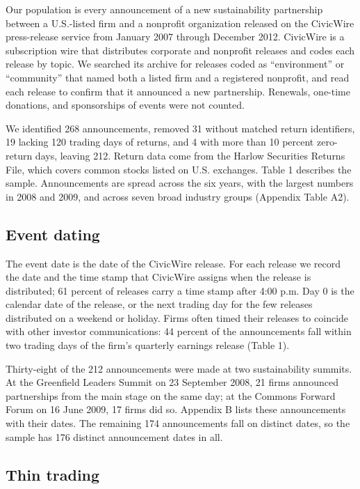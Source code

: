 \documentclass[11pt]{article}
\begin{document}
Our population is every announcement of a new sustainability partnership between a U.S.-listed firm and a nonprofit organization released on the CivicWire press-release service from January 2007 through December 2012. CivicWire is a subscription wire that distributes corporate and nonprofit releases and codes each release by topic. We searched its archive for releases coded as ``environment'' or ``community'' that named both a listed firm and a registered nonprofit, and read each release to confirm that it announced a new partnership. Renewals, one-time donations, and sponsorships of events were not counted.

We identified 268 announcements, removed 31 without matched return identifiers, 19 lacking 120 trading days of returns, and 4 with more than 10 percent zero-return days, leaving 212. Return data come from the Harlow Securities Returns File, which covers common stocks listed on U.S. exchanges. Table 1 describes the sample. Announcements are spread across the six years, with the largest numbers in 2008 and 2009, and across seven broad industry groups (Appendix Table A2).

\subsection{Event dating}

The event date is the date of the CivicWire release. For each release we record the date and the time stamp that CivicWire assigns when the release is distributed; 61 percent of releases carry a time stamp after 4:00 p.m. Day 0 is the calendar date of the release, or the next trading day for the few releases distributed on a weekend or holiday. Firms often timed their releases to coincide with other investor communications: 44 percent of the announcements fall within two trading days of the firm's quarterly earnings release (Table 1).

Thirty-eight of the 212 announcements were made at two sustainability summits. At the Greenfield Leaders Summit on 23 September 2008, 21 firms announced partnerships from the main stage on the same day; at the Commons Forward Forum on 16 June 2009, 17 firms did so. Appendix B lists these announcements with their dates. The remaining 174 announcements fall on distinct dates, so the sample has 176 distinct announcement dates in all.

\subsection{Thin trading}
\end{document}
